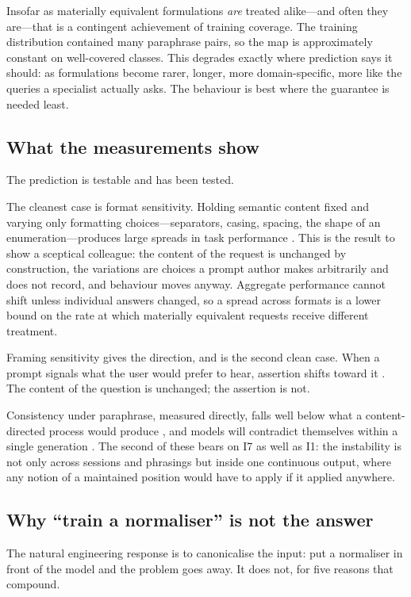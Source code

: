 \documentclass[11pt]{article}
\theoremstyle{plain}
\theoremstyle{definition}
\begin{document}
Insofar as materially equivalent formulations \emph{are} treated alike---and often
they are---that is a contingent achievement of training coverage. The training
distribution contained many paraphrase pairs, so the map is approximately constant
on well-covered classes. This degrades exactly where prediction says it should: as
formulations become rarer, longer, more domain-specific, more like the queries a
specialist actually asks. The behaviour is best where the guarantee is needed
least.

\subsection{What the measurements show}

The prediction is testable and has been tested.

The cleanest case is format sensitivity. Holding semantic content fixed
and varying only formatting choices---separators, casing, spacing, the shape of an
enumeration---produces large spreads in task performance \citep{sclar2024}. This is
the result to show a sceptical colleague: the content of the request is unchanged by
construction, the variations are choices a prompt author makes arbitrarily and does
not record, and behaviour moves anyway. Aggregate performance cannot shift unless
individual answers changed, so a spread across formats is a lower bound on the rate
at which materially equivalent requests receive different treatment.

Framing sensitivity gives the direction, and is the second clean case. When a prompt signals what the user
would prefer to hear, assertion shifts toward it \citep{sharma2024}. The content
of the question is unchanged; the assertion is not.

Consistency under paraphrase, measured directly, falls well below what a
content-directed process would produce \citep{elazar2021}, and models will
contradict themselves within a single generation \citep{mundler2024}. The second
of these bears on I7 as well as I1: the instability is not only across sessions
and phrasings but inside one continuous output, where any notion of a maintained
position would have to apply if it applied anywhere.

\subsection{Why ``train a normaliser'' is not the answer}
\label{sec:normaliser}

The natural engineering response is to canonicalise the input: put a normaliser in
front of the model and the problem goes away. It does not, for five reasons that
compound.
\end{document}
